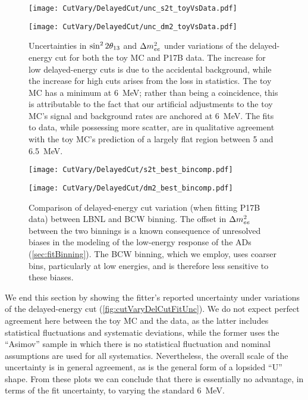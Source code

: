 \documentclass[../thesis.tex]{subfiles}
\begin{document}
\begin{figure}[ht]
  \begin{minipage}{0.5\linewidth}%
    \texttt{[image: CutVary/DelayedCut/unc\_s2t\_toyVsData.pdf]}%
  \end{minipage}%
  \begin{minipage}{0.5\linewidth}%
    \texttt{[image: CutVary/DelayedCut/unc\_dm2\_toyVsData.pdf]}%
  \end{minipage}%
  \caption[Uncertainties in $\SinSq$ and $\Dmsqee$ under variations of the delayed-energy cut for both the toy MC and P17B data.]{Uncertainties in $\SinSq$ and $\Dmsqee$ under variations of the delayed-energy cut for both the toy MC and P17B data. The increase for low delayed-energy cuts is due to the accidental background, while the increase for high cuts arises from the loss in statistics. The toy MC has a minimum at 6~MeV; rather than being a coincidence, this is attributable to the fact that our artificial adjustments to the toy MC's signal and background rates are anchored at 6~MeV. The fits to data, while possessing more scatter, are in qualitative agreement with the toy MC's prediction of a largely flat region between 5 and 6.5~MeV.}
  \label{fig:cutVaryDelCutFitUnc}
\end{figure}

\begin{figure}[ht]
  \begin{minipage}{0.5\linewidth}%
    \texttt{[image: CutVary/DelayedCut/s2t\_best\_bincomp.pdf]}%
  \end{minipage}%
  \begin{minipage}{0.5\linewidth}%
    \texttt{[image: CutVary/DelayedCut/dm2\_best\_bincomp.pdf]}%
  \end{minipage}%
  \caption{Comparison of delayed-energy cut variation (when fitting P17B data) between LBNL and BCW binning. The offset in $\Dmsqee$ between the two binnings is a known consequence of unresolved biases in the modeling of the low-energy response of the ADs (\autoref{sec:fitBinning}). The BCW binning, which we employ, uses coarser bins, particularly at low energies, and is therefore less sensitive to these biases.}
  \label{fig:cutVaryDelCutDataResultsBCW}
\end{figure}

We end this section by showing the fitter's reported uncertainty under variations of the delayed-energy cut (\autoref{fig:cutVaryDelCutFitUnc}). We do not expect perfect agreement here between the toy MC and the data, as the latter includes statistical fluctuations and systematic deviations, while the former uses the ``Asimov'' sample in which there is no statistical fluctuation and nominal assumptions are used for all systematics. Nevertheless, the overall scale of the uncertainty is in general agreement, as is the general form of a lopsided ``U'' shape. From these plots we can conclude that there is essentially no advantage, in terms of the fit uncertainty, to varying the standard 6~MeV.
\end{document}
